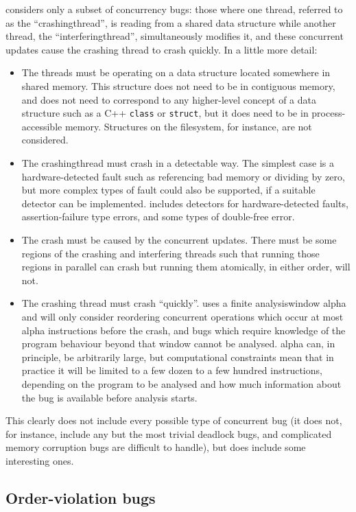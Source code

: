 {\Technique} considers only a subset of concurrency bugs: those where
one thread, referred to as the ``\gls{crashingthread}'', is reading
from a shared data structure while another thread, the
``\gls{interferingthread}'', simultaneously modifies it, and these
concurrent updates cause the crashing thread to crash quickly.  In a
little more detail:
\begin{itemize}
\item The threads must be operating on a data structure located
  somewhere in shared memory.  This structure does not need to be in
  contiguous memory, and does not need to correspond to any
  higher-level concept of a data structure such as a C++
  \texttt{class} or \texttt{struct}, but it does need to be in
  process-accessible memory.  Structures on the filesystem, for
  instance, are not considered.
\item The \gls{crashingthread} must crash in a detectable way.  The
  simplest case is a hardware-detected fault such as referencing bad
  memory or dividing by zero, but more complex types of fault could
  also be supported, if a suitable detector can be implemented.
  {\Implementation} includes detectors for hardware-detected faults,
  assertion-failure type errors, and some types of double-free error.
\item The crash must be caused by the concurrent updates.  There must
  be some regions of the crashing and interfering threads such that
  running those regions in parallel can crash but running them
  atomically, in either order, will not.
\item The crashing thread must crash ``quickly''.  {\Technique} uses a
  finite \gls{analysiswindow} \gls{alpha} and will only consider
  reordering concurrent operations which occur at most \gls{alpha}
  instructions before the crash, and bugs which require knowledge of
  the program behaviour beyond that window cannot be analysed.
  \gls{alpha} can, in principle, be arbitrarily large, but
  computational constraints mean that in practice it will be limited
  to a few dozen to a few hundred instructions, depending on the
  program to be analysed and how much information about the bug is
  available before analysis starts.
\end{itemize}
This clearly does not include every possible type of concurrent bug
(it does not, for instance, include any but the most trivial deadlock
bugs, and complicated memory corruption bugs are difficult to handle),
but does include some interesting ones.

\subsection{Order-violation bugs}

